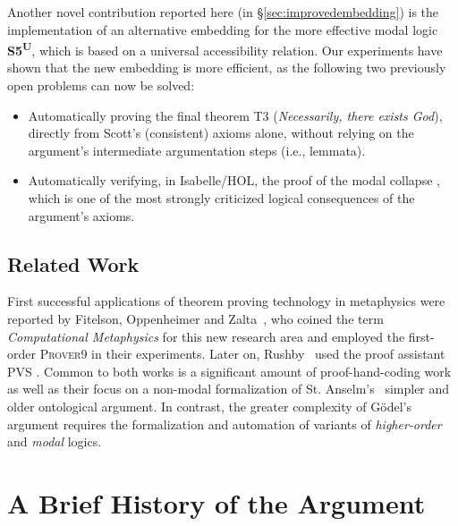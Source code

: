 \documentclass{article}
\newcommand{\logic}[1]{\textbf{#1}\xspace}
\newcommand{\SFiveU}{\logic{S5\textsuperscript{U}}}
\begin{document}
Another novel contribution reported here (in
\S\ref{sec:improvedembedding}) is the implementation of an alternative
embedding for the 
more effective modal logic \SFiveU, which is
based on a universal accessibility relation. Our experiments have
shown that the new embedding is more efficient, as the following two
previously open problems can now be solved:
\begin{itemize}
\item Automatically proving the final theorem T3 (\textit{Necessarily, there
  exists God}), directly from Scott's  (consistent) axioms
  alone, without relying on the argument's intermediate argumentation
  steps (i.e., lemmata).
\item Automatically verifying, in Isabelle/HOL, the proof of the modal
  collapse \cite{Sobel}, which is one of the most strongly criticized
  logical consequences of the argument's axioms.
\end{itemize}


\subsection{Related Work}

First successful applications of theorem proving technology in
metaphysics were reported by Fitelson, Oppenheimer and
Zalta~, who coined the term \textit{Computational Metaphysics} for this new research area and employed the first-order
\textsc{Prover9} \cite{prover9-mace4} in their experiments. Later on, Rushby~ used the proof assistant \textsc{PVS} \cite{cade92-pvs}. Common to both
works is a significant amount of proof-hand-coding work as well as their
focus on a non-modal formalization of St. Anselm's~ simpler 
and older ontological argument. In contrast, the greater complexity of G\"odel's argument requires the formalization and automation of variants of \emph{higher-order} and \emph{modal} logics.


\section{A Brief History of the Argument}\label{sec:history}
\end{document}
